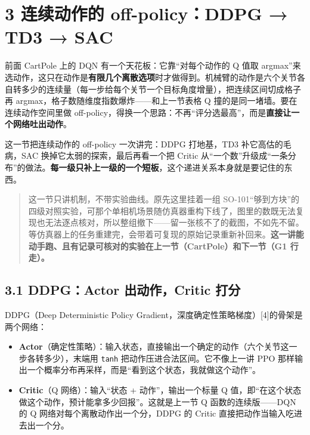 \documentclass[
  chinese,
]{ctexart}
\providecommand{\tightlist}{%
  \setlength{\itemsep}{0pt}\setlength{\parskip}{0pt}}
\begin{document}
\section{3 连续动作的 off-policy：DDPG → TD3 →
SAC}\label{ux8fdeux7eedux52a8ux4f5cux7684-off-policyddpg-td3-sac}

前面 CartPole 上的 DQN 有一个天花板：它靠``对每个动作的 Q 值取
argmax''来选动作，这只在动作是\textbf{有限几个离散选项}时才做得到。机械臂的动作是六个关节各自转多少的连续量（每一步给每个关节一个目标角度增量），把连续区间切成格子再
argmax，格子数随维度指数爆炸------和上一节表格 Q
撞的是同一堵墙。要在连续动作空间里做
off-policy，得换一个思路：不再``评分选最高''，而是\textbf{直接让一个网络吐出动作}。

这一节把连续动作的 off-policy 一次讲完：DDPG 打地基，TD3
补它高估的毛病，SAC 换掉它太弱的探索，最后再看一个把 Critic
从``一个数''升级成``一条分布''的做法。\textbf{每一级只补上一级的一个短板}，这个递进关系本身就是要记住的东西。

\begin{quote}
这一节只讲机制，不带实验曲线。原先这里挂着一组
SO-101``够到方块''的四级对照实验，可那个单相机场景随仿真器重构下线了，图里的数既无法复现也无法逐点核对，所以整组撤下------留一张核不了的截图，不如先不留。等仿真器上的任务重建完，会带着可复现的原始记录重新补回来。\textbf{这一讲能动手跑、且有记录可核对的实验在上一节（CartPole）和下一节（G1
行走）。}
\end{quote}

\subsection{3.1 DDPG：Actor 出动作，Critic
打分}\label{ddpgactor-ux51faux52a8ux4f5ccritic-ux6253ux5206}

DDPG（Deep Deterministic Policy
Gradient，深度确定性策略梯度）{[}4{]}的骨架是两个网络：

\begin{itemize}
\tightlist
\item
  \textbf{Actor}（确定性策略）：输入状态，直接输出一个确定的动作（六个关节这一步各转多少），末端用
  \texttt{tanh} 把动作压进合法区间。它不像上一讲 PPO
  那样输出一个概率分布再采样，而是``看到这个状态，我就做这个动作''。
\item
  \textbf{Critic}（Q 网络）：输入``状态 + 动作''，输出一个标量 Q
  值，即``在这个状态做这个动作，预计能拿多少回报''。这就是上一节 Q
  函数的连续版------DQN 的 Q 网络对每个离散动作出一个分，DDPG 的 Critic
  直接把动作当输入吃进去出一个分。
\end{itemize}
\end{document}
